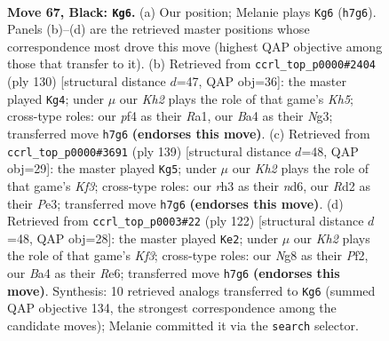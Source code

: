 \documentclass[11pt]{article}
\begin{document}
\clearpage

\begin{figure}[p]\centering
\begin{subfigure}{0.46\textwidth}\centering
\resizebox{\linewidth}{!}{%
\newchessgame
\chessboard[
  setfen={6n1/pR5k/P6p/1P3p2/b4P2/7R/3r4/4b1K1 b - - 4 67},
  showmover=false,
  pgfstyle=straightmove, color=movearrow, markmove={h7-g6}
]}
\caption{}
\end{subfigure}\hfill
\begin{subfigure}{0.46\textwidth}\centering
\resizebox{\linewidth}{!}{%
\newchessgame
\chessboard[
  setfen={3b4/5p1k/3p4/p2Pr2K/Bp5P/6N1/8/R7 w - - 1 66},
  showmover=false,
  pgfstyle=straightmove, color=movearrow, markmove={h5-g4}
]}
\caption{}
\end{subfigure}
\\[4pt]
\begin{subfigure}{0.46\textwidth}\centering
\resizebox{\linewidth}{!}{%
\newchessgame
\chessboard[
  setfen={8/8/P2N1k1R/2p1n3/6p1/2P1p1P1/r6P/4K3 b - - 9 70},
  showmover=false,
  pgfstyle=straightmove, color=movearrow, markmove={f6-g5}
]}
\caption{}
\end{subfigure}\hfill
\begin{subfigure}{0.46\textwidth}\centering
\resizebox{\linewidth}{!}{%
\newchessgame
\chessboard[
  setfen={5k2/1R6/3pR3/1p3p2/5P1r/1P1r1K2/5P2/8 w - - 6 62},
  showmover=false,
  pgfstyle=straightmove, color=movearrow, markmove={f3-e2}
]}
\caption{}
\end{subfigure}
\caption{\textbf{Move 67, Black: \texttt{Kg6}.} (a) Our position; Melanie plays \texttt{Kg6} (\texttt{h7g6}). Panels (b)--(d) are the retrieved master positions whose correspondence most drove this move (highest QAP objective among those that transfer to it). (b) Retrieved from \texttt{ccrl\_top\_p0000\#2404} (ply 130) [structural distance $d$=47, QAP obj=36]: the master played \texttt{Kg4}; under $\mu$ our \emph{Kh2} plays the role of that game's \emph{Kh5}; cross-type roles: our \emph{p}f4 as their \emph{R}a1, our \emph{B}a4 as their \emph{N}g3; transferred move \texttt{h7g6} \textbf{(endorses this move)}. (c) Retrieved from \texttt{ccrl\_top\_p0000\#3691} (ply 139) [structural distance $d$=48, QAP obj=29]: the master played \texttt{Kg5}; under $\mu$ our \emph{Kh2} plays the role of that game's \emph{Kf3}; cross-type roles: our \emph{r}h3 as their \emph{n}d6, our \emph{R}d2 as their \emph{P}e3; transferred move \texttt{h7g6} \textbf{(endorses this move)}. (d) Retrieved from \texttt{ccrl\_top\_p0003\#22} (ply 122) [structural distance $d$=48, QAP obj=28]: the master played \texttt{Ke2}; under $\mu$ our \emph{Kh2} plays the role of that game's \emph{Kf3}; cross-type roles: our \emph{N}g8 as their \emph{P}f2, our \emph{B}a4 as their \emph{R}e6; transferred move \texttt{h7g6} \textbf{(endorses this move)}. Synthesis: 10 retrieved analogs transferred to \texttt{Kg6} (summed QAP objective 134, the strongest correspondence among the candidate moves); Melanie committed it via the \texttt{search} selector.}
\label{fig:thought-m133}
\end{figure}
\end{document}
